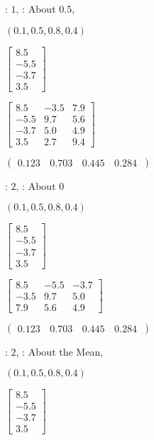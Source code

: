 \documentclass{article}
\begin{document}
: $1$, : About 
$0.5$,

$\left( 0.1,0.5,0.8,0.4\right) $

$\left[ 
\begin{array}{r}
8.5 \\ 
-5.5 \\ 
-3.7 \\ 
3.5%
\end{array}%
\right] $

$\left[ 
\begin{array}{ccc}
8.5 & -3.5 & 7.9 \\ 
-5.5 & 9.7 & 5.6 \\ 
-3.7 & 5.0 & 4.9 \\ 
3.5 & 2.7 & 9.4%
\end{array}%
\right] $

$\left( 
\begin{array}{cccc}
0.123\, & 0.703\, & 0.445\, & 0.284\,%
\end{array}%
\right) $

: $2$, : About 
$0$

$\left( 0.1,0.5,0.8,0.4\right) $

$\left[ 
\begin{array}{r}
8.5 \\ 
-5.5 \\ 
-3.7 \\ 
3.5%
\end{array}%
\right] $

$\left[ 
\begin{array}{rrr}
8.5 & -5.5 & -3.7 \\ 
-3.5 & 9.7 & 5.0 \\ 
7.9 & 5.6 & 4.9%
\end{array}%
\right] $

$\left( 
\begin{array}{cccc}
0.123\, & 0.703\, & 0.445\, & 0.284\,%
\end{array}%
\right) $

: $2$, : About
the Mean,

$\left( 0.1,0.5,0.8,0.4\right) $

$\left[ 
\begin{array}{r}
8.5 \\ 
-5.5 \\ 
-3.7 \\ 
3.5%
\end{array}%
\right] $
\end{document}
